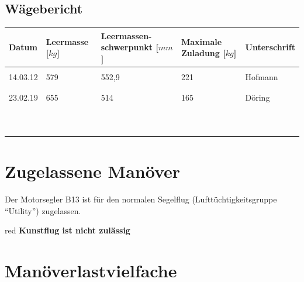 \subsection{Wägebericht}

\begin{tiny}
\begin{tabular}{|m{}|m{}|m{2cm}|m{}|m{}|}
\hline
Datum & Leermasse [$kg$] & Leermassen- schwerpunkt [$mm$]  & Maximale Zuladung [$kg$] & Unterschrift\\

\hline
& & & &\\
14.03.12 & 579 & 552,9 & 221 & Hofmann\\
& & & &\\
\hline
& & & &\\
23.02.19 & 655 & 514 & 165 & Döring\\
& & & &\\
\hline
& & & &\\
& & & &\\
& & & &\\
\hline
& & & &\\
& & & &\\
& & & &\\
\hline
& & & &\\
& & & &\\
& & & &\\
\hline

\end{tabular}
\end{tiny}


\section{Zugelassene Manöver}
Der Motorsegler B13 ist für den normalen Segelflug (Lufttüchtigkeitsgruppe "`Utility"') zugelassen.\\
\newline
\begin{color}{red}
\textbf{Kunstflug ist nicht zulässig}
\end{color}

\section{Manöverlastvielfache}

